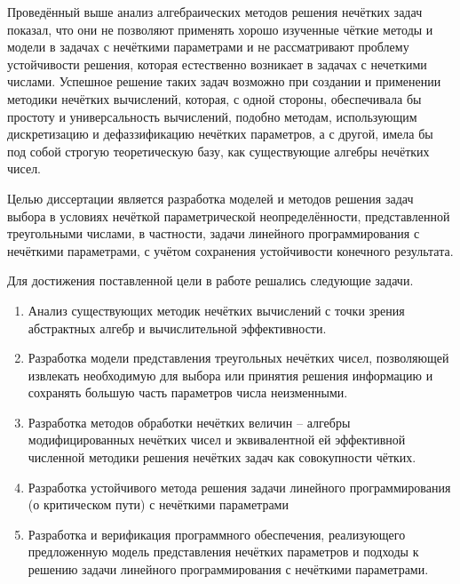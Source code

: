 Проведённый выше анализ алгебраических методов решения нечётких задач показал, что они не позволяют применять хорошо изученные чёткие методы и модели в задачах с нечёткими параметрами и не рассматривают проблему устойчивости решения, которая естественно возникает в задачах с нечеткими числами. Успешное решение таких задач возможно при создании и применении методики нечётких вычислений, которая, с одной стороны, обеспечивала бы простоту и универсальность вычислений, подобно методам, использующим дискретизацию и дефаззификацию нечётких параметров, а с другой, имела бы под собой строгую теоретическую базу, как существующие алгебры нечётких чисел.

Целью диссертации является разработка моделей и методов решения задач выбора в условиях нечёткой параметрической неопределённости, представленной треугольными числами, в частности, задачи линейного программирования с нечёткими параметрами, с учётом сохранения устойчивости конечного результата.

Для достижения поставленной цели в работе решались следующие задачи.

\begin{enumerate}
	\item Анализ существующих методик нечётких вычислений с точки зрения абстрактных алгебр и вычислительной эффективности.
	\item Разработка модели представления треугольных нечётких чисел, позволяющей извлекать необходимую для выбора или принятия решения информацию и сохранять большую часть параметров числа неизменными. 
	\item Разработка методов обработки нечётких величин – алгебры модифицированных нечётких чисел и эквивалентной ей эффективной численной методики решения нечётких задач как совокупности чётких.
	\item Разработка устойчивого метода решения задачи линейного программирования (о критическом пути) с нечёткими параметрами
	\item Разработка и верификация программного обеспечения, реализующего предложенную модель представления нечётких параметров и подходы к решению задачи линейного программирования с нечёткими параметрами.
\end{enumerate}
